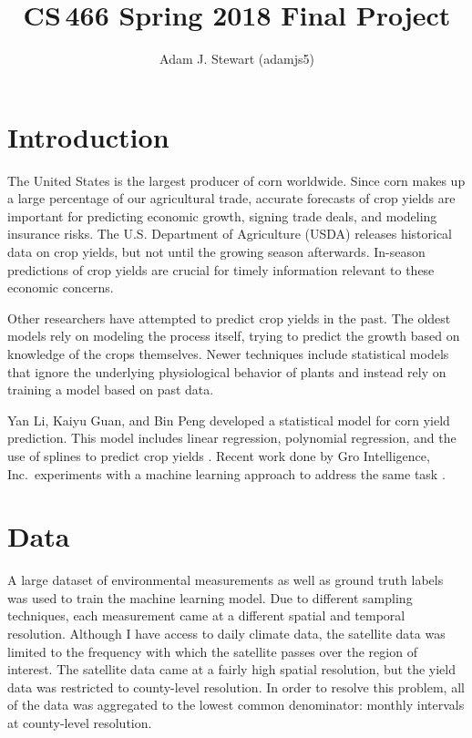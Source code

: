 \documentclass[letterpaper]{article}
\begin{document}
\title{CS\,466 Spring 2018 Final Project}
\author{Adam J. Stewart (adamjs5)}

\maketitle

\section{Introduction}

The United States is the largest producer of corn worldwide. Since corn makes up a large percentage of our agricultural trade, accurate forecasts of crop yields are important for predicting economic growth, signing trade deals, and modeling insurance risks. The U.S. Department of Agriculture (USDA) releases historical data on crop yields, but not until the growing season afterwards. In-season predictions of crop yields are crucial for timely information relevant to these economic concerns.

Other researchers have attempted to predict crop yields in the past. The oldest models rely on modeling the process itself, trying to predict the growth based on knowledge of the crops themselves. Newer techniques include statistical models that ignore the underlying physiological behavior of plants and instead rely on training a model based on past data.

Yan Li, Kaiyu Guan, and Bin Peng developed a statistical model for corn yield prediction. This model includes linear regression, polynomial regression, and the use of splines to predict crop yields \cite{li18}. Recent work done by Gro Intelligence, Inc.\ experiments with a machine learning approach to address the same task \cite{cai18}.

\section{Data}

A large dataset of environmental measurements as well as ground truth labels was used to train the machine learning model. Due to different sampling techniques, each measurement came at a different spatial and temporal resolution. Although I have access to daily climate data, the satellite data was limited to the frequency with which the satellite passes over the region of interest. The satellite data came at a fairly high spatial resolution, but the yield data was restricted to county-level resolution. In order to resolve this problem, all of the data was aggregated to the lowest common denominator: monthly intervals at county-level resolution.
\end{document}
